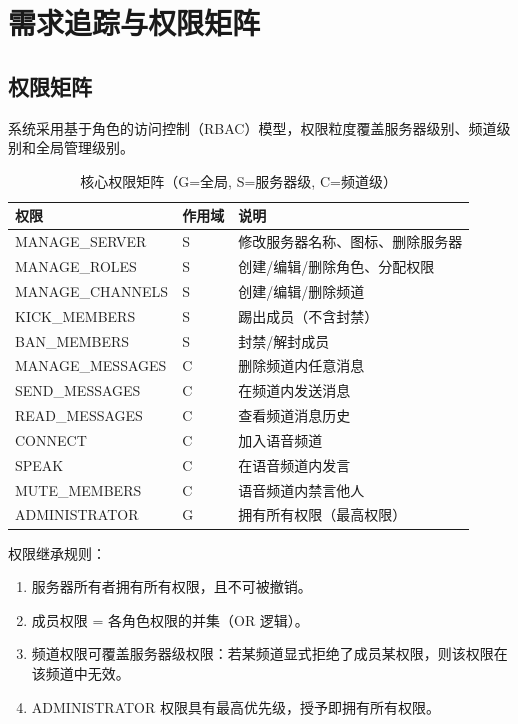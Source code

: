 \section{需求追踪与权限矩阵}

\subsection{权限矩阵}

系统采用基于角色的访问控制（RBAC）模型，权限粒度覆盖服务器级别、频道级别和全局管理级别。

\begin{table}[H]
\centering
\caption{核心权限矩阵（G=全局, S=服务器级, C=频道级）}
\begin{tabularx}{\textwidth}{L{3.2cm}L{1.0cm}Y}
\toprule
\textbf{权限} & \textbf{作用域} & \textbf{说明} \\
\midrule
MANAGE\_SERVER & S & 修改服务器名称、图标、删除服务器 \\
MANAGE\_ROLES & S & 创建/编辑/删除角色、分配权限 \\
MANAGE\_CHANNELS & S & 创建/编辑/删除频道 \\
KICK\_MEMBERS & S & 踢出成员（不含封禁） \\
BAN\_MEMBERS & S & 封禁/解封成员 \\
MANAGE\_MESSAGES & C & 删除频道内任意消息 \\
SEND\_MESSAGES & C & 在频道内发送消息 \\
READ\_MESSAGES & C & 查看频道消息历史 \\
CONNECT & C & 加入语音频道 \\
SPEAK & C & 在语音频道内发言 \\
MUTE\_MEMBERS & C & 语音频道内禁言他人 \\
ADMINISTRATOR & G & 拥有所有权限（最高权限） \\
\bottomrule
\end{tabularx}
\label{tab:perm-matrix}
\end{table}

权限继承规则：
\begin{enumerate}[itemsep=0pt]
  \item 服务器所有者拥有所有权限，且不可被撤销。
  \item 成员权限 = 各角色权限的并集（OR 逻辑）。
  \item 频道权限可覆盖服务器级权限：若某频道显式拒绝了成员某权限，则该权限在该频道中无效。
  \item ADMINISTRATOR 权限具有最高优先级，授予即拥有所有权限。
\end{enumerate}

